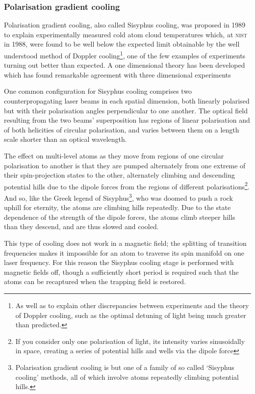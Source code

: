 \subsubsection{Polarisation gradient cooling}

Polarisation gradient cooling, also called Sisyphus cooling, was proposed in 1989 \cite{dalibard_laser_1989, ungar_optical_1989} to explain experimentally measured cold atom cloud temperatures \cite{lett_optical_1989} which, at \textsc{nist} in 1988, were found to be well below the expected limit obtainable by the well understood method of Doppler cooling\footnote{As well as to explain other discrepancies between experiments and the theory of Doppler cooling, such as the optimal detuning of light being much greater than predicted.}, one of the few examples of experiments turning out better than expected. A one dimensional theory has been developed \cite{dalibard_laser_1989} which has found remarkable agreement with three dimensional experiments \cite{salomon_laser_1990}

One common configuration for Sisyphus cooling comprises two counterpropagating laser beams in each spatial dimension, both linearly polarised but with their polarisation angles perpendicular to one another. The optical field resulting from the two beams' superposition has regions of linear polarisation and of both helicities of circular polarisation, and varies between them on a length scale shorter than an optical wavelength.

The effect on multi-level atoms as they move from regions of one circular polarisation to another is that they are pumped alternately from one extreme of their spin-projection states to the other, alternately climbing and descending potential hills due to the dipole forces from the regions of different polarisations\footnote{If you consider only one polarisation of light, its intensity varies sinusoidally in space, creating a series of potential hills and wells via the dipole force}. And so, like the Greek legend of Sisyphus\footnote{Polarisation gradient cooling is but one of a family of so called `Sisyphus cooling' methods, all of which involve atoms repeatedly climbing potential hills.}, who was doomed to push a rock uphill for eternity, the atoms are climbing hills repeatedly. Due to the state dependence of the strength of the dipole forces, the atoms climb steeper hills than they descend, and are thus slowed and cooled.

This type of cooling does not work in a magnetic field; the splitting of transition frequencies makes it impossible for an atom to traverse its spin manifold on one laser frequency. For this reason the Sisyphus cooling stage is performed with magnetic fields off, though a sufficiently short period is required such that the atoms can be recaptured when the trapping field is restored.


